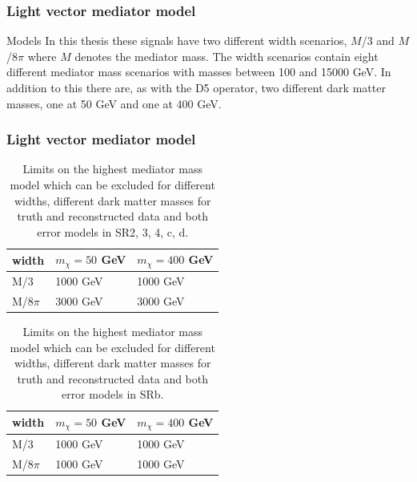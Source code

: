 \documentclass[handout]{beamer}
\begin{document}
\begin{frame}[shrink=10]\frametitle{Light vector mediator model}
\begin{block}{Models}
In this thesis these signals have two different width scenarios, $M$/3 and $M$/8$\pi$ where $M$ denotes the mediator mass. The width scenarios contain eight different mediator mass scenarios with masses between 100 and 15000 GeV. In addition to this there are, as with the D5 operator, two different dark matter masses, one at 50 GeV and one at 400 GeV.
\end{block}
\end{frame}
\begin{frame}[shrink=10]\frametitle{Light vector mediator model}
\begin{table}[ht]
\begin{center}
\begin{tabular}{|l|l|l|}
\hline
width & $m_{\chi}=50$ GeV & $m_{\chi}=400$ GeV \\ \hline
M/3 & 1000 GeV & 1000 GeV \\ \hline
M/$8\pi$ & 3000 GeV & 3000 GeV\\ \hline
\end{tabular}
\caption{Limits on the highest mediator mass model which can be excluded for different widths, different dark matter masses for truth and reconstructed data and both error models in SR2, 3, 4, c, d.}
\label{tab:mediatorpass}
\end{center}
\end{table}
\begin{table}[ht]
\begin{center}
\begin{tabular}{|l|l|l|}
\hline
width & $m_{\chi}=50$ GeV & $m_{\chi}=400$ GeV \\ \hline
M/3 & 1000 GeV & 1000 GeV\\ \hline
M/$8\pi$ & 1000 GeV & 1000 GeV\\ \hline
\end{tabular}
\caption{Limits on the highest mediator mass model which can be excluded for different widths, different dark matter masses for truth and reconstructed data and both error models in SRb.}
\label{tab:mediatorpass2}
\end{center}
\end{table}
\end{frame}

\end{document}
